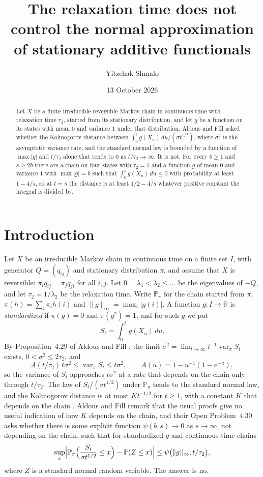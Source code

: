 \documentclass[11pt]{amsart}
\title[Relaxation time and normal approximation]{The relaxation time does not control the normal approximation of stationary additive functionals}
\author{Yitzchak Shmalo}
\date{13 October 2026}
\theoremstyle{remark}
\numberwithin{equation}{section}
\newcommand{\Pp}{\mathbb P}
\DeclareMathOperator{\var}{var}
\begin{document}
\begin{abstract}
Let $X$ be a finite irreducible reversible Markov chain in continuous time with relaxation time $\tau_2$, started from its stationary distribution, and let $g$ be a function on its states with mean $0$ and variance $1$ under that distribution. Aldous and Fill asked whether the Kolmogorov distance between $\int_0^tg(X_u)\,du/(\sigma t^{1/2})$, where $\sigma^2$ is the asymptotic variance rate, and the standard normal law is bounded by a function of $\max|g|$ and $t/\tau_2$ alone that tends to $0$ as $t/\tau_2\to\infty$. It is not. For every $b\ge1$ and $s\ge2b$ there are a chain on four states with $\tau_2=1$ and a function $g$ of mean $0$ and variance $1$ with $\max|g|=b$ such that $\int_0^sg(X_u)\,du\le0$ with probability at least $1-4/s$, so at $t=s$ the distance is at least $1/2-4/s$ whatever positive constant the integral is divided by.
\end{abstract}
\maketitle

\section{Introduction}

Let $X$ be an irreducible Markov chain in continuous time on a finite set $I$, with generator $Q=(q_{ij})$ and stationary distribution $\pi$, and assume that $X$ is reversible: $\pi_iq_{ij}=\pi_jq_{ji}$ for all $i,j$. Let $0=\lambda_1<\lambda_2\le\dots$ be the eigenvalues of $-Q$, and let $\tau_2=1/\lambda_2$ be the relaxation time. Write $\Pp_\pi$ for the chain started from $\pi$, $\pi(h)=\sum_i\pi_ih(i)$ and $\|g\|_\infty=\max_i|g(i)|$. A function $g\colon I\to\mathbb R$ is \emph{standardized} if $\pi(g)=0$ and $\pi(g^2)=1$, and for such $g$ we put
\[
S_t=\int_0^tg(X_u)\,du .
\]
By Proposition~4.29 of Aldous and Fill \cite{AF}, the limit $\sigma^2=\lim_{t\to\infty}t^{-1}\var_\pi S_t$ exists, $0<\sigma^2\le2\tau_2$, and
\[
A(t/\tau_2)\,t\sigma^2\le\var_\pi S_t\le t\sigma^2,\qquad A(u)=1-u^{-1}(1-e^{-u}),
\]
so the variance of $S_t$ approaches $t\sigma^2$ at a rate that depends on the chain only through $t/\tau_2$. The law of $S_t/(\sigma t^{1/2})$ under $\Pp_\pi$ tends to the standard normal law, and the Kolmogorov distance is at most $Kt^{-1/2}$ for $t\ge1$, with a constant $K$ that depends on the chain \cite[Proposition~4.51]{AF}. Aldous and Fill remark that the usual proofs give no useful indication of how $K$ depends on the chain, and their Open Problem~4.30 asks whether there is some explicit function $\psi(b,s)\to0$ as $s\to\infty$, not depending on the chain, such that for standardized $g$ and continuous-time chains
\begin{equation}\label{eq:op}
\sup_x\Bigl|\Pp_\pi\Bigl(\frac{S_t}{\sigma t^{1/2}}\le x\Bigr)-\Pp(Z\le x)\Bigr|\le\psi\bigl(\|g\|_\infty,t/\tau_2\bigr),
\end{equation}
where $Z$ is a standard normal random variable. The answer is no.
\end{document}
